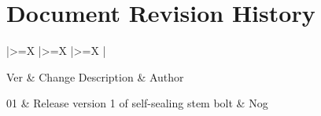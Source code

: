 \documentclass[a4paper,12pt]{article}
\theoremstyle{definition}
\def\arraystretch{1.5}%
\begin{document}
\section{Document Revision History}



\bgroup

\small
\def\arraystretch{1.5}%
\begin{xltabular}{\textwidth}{
	|>{\hsize\linewidth=\hsize}X
	|>{\hsize\linewidth=\hsize}X
	|>{\hsize\linewidth=\hsize}X
	|
	}
	\hline


	Ver  &
	Change Description  &
	Author  \\ \hline \endhead

	01 & Release version 1 of self-sealing stem bolt & Nog \\ \hline

\end{xltabular}
\egroup
\end{document}
